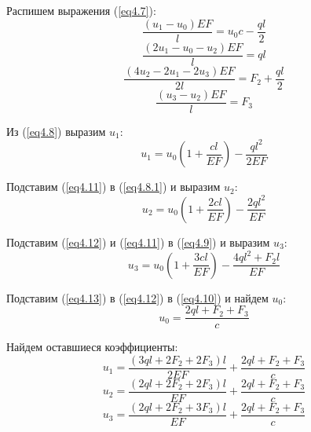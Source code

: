 Распишем выражения (\ref{eq4.7}):
\begin{equation}
    \label{eq4.8}
    \frac{(u_1 - u_0)EF}{l} = u_0c - \frac{ql}{2}
\end{equation}
\begin{equation}
    \label{eq4.8.1}
    \frac{(2u_1 - u_0 - u_2)EF}{l} = ql
\end{equation}
\begin{equation}
    \label{eq4.9}
    \frac{(4u_2 - 2u_1 - 2u_3)EF}{2l} = F_2 + \frac{ql}{2}
\end{equation}
\begin{equation}
    \label{eq4.10}
    \frac{(u_3 - u_2)EF}{l} = F_3
\end{equation}

Из (\ref{eq4.8}) выразим $u_1$:
\begin{equation}
    \label{eq4.11}
    u_1 = u_0 \left( 1 + \frac{cl}{EF} \right) - \frac{ql^2}{2EF}
\end{equation}

Подставим (\ref{eq4.11}) в (\ref{eq4.8.1}) и выразим $u_2$:
\begin{equation}
    \label{eq4.12}
    u_2 = u_0 \left( 1 + \frac{2cl}{EF} \right) - \frac{2ql^2}{EF}
\end{equation}

Подставим (\ref{eq4.12}) и (\ref{eq4.11}) в (\ref{eq4.9}) и выразим $u_3$:
\begin{equation}
    \label{eq4.13}
    u_3 = u_0 \left( 1 + \frac{3cl}{EF} \right) - \frac{4ql^2 + F_2l}{EF}
\end{equation}

Подставим (\ref{eq4.13}) в (\ref{eq4.12}) в (\ref{eq4.10}) и найдем $u_0$:
\begin{equation}
    \label{eq4.14}
    u_0 = \frac{2ql + F_2 + F_3}{c}
\end{equation}

Найдем оставшиеся коэффициенты:
\begin{equation}
    \label{eq4.14.1}
    u_1 = \frac{(3ql + 2F_2 + 2F_3)l}{2EF} + \frac{2ql + F_2 + F_3}{c}
\end{equation}
\begin{equation}
    \label{eq4.15}
    u_2 = \frac{(2ql + 2F_2 + 2F_3)l}{EF} + \frac{2ql + F_2 + F_3}{c}
\end{equation}
\begin{equation}
    \label{eq4.15.1}
    u_3 = \frac{(2ql + 2F_2 + 3F_3)l}{EF} + \frac{2ql + F_2 + F_3}{c}
\end{equation}

